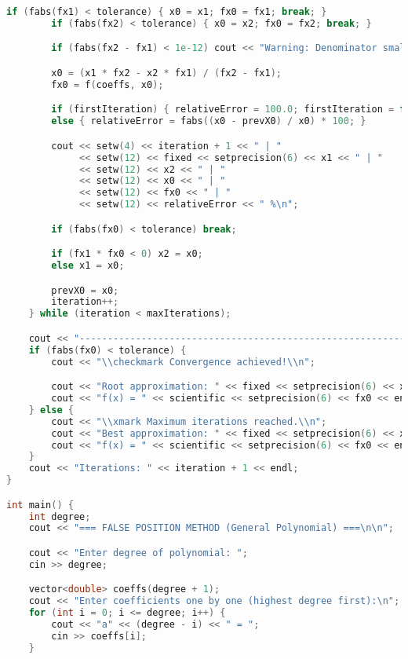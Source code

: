 \documentclass[12pt,a4paper]{article}
\begin{document}
\begin{lstlisting}[language=C++, caption={False Position Method for General Polynomials}, label={lst:falseposition}]
        if (fabs(fx1) < tolerance) { x0 = x1; fx0 = fx1; break; }
        if (fabs(fx2) < tolerance) { x0 = x2; fx0 = fx2; break; }

        if (fabs(fx2 - fx1) < 1e-12) cout << "Warning: Denominator small, may cause precision issues.\n";

        x0 = (x1 * fx2 - x2 * fx1) / (fx2 - fx1);
        fx0 = f(coeffs, x0);

        if (firstIteration) { relativeError = 100.0; firstIteration = false; }
        else { relativeError = fabs((x0 - prevX0) / x0) * 100; }

        cout << setw(4) << iteration + 1 << " | "
             << setw(12) << fixed << setprecision(6) << x1 << " | "
             << setw(12) << x2 << " | "
             << setw(12) << x0 << " | "
             << setw(12) << fx0 << " | "
             << setw(12) << relativeError << " %\n";

        if (fabs(fx0) < tolerance) break;

        if (fx1 * fx0 < 0) x2 = x0;
        else x1 = x0;

        prevX0 = x0;
        iteration++;
    } while (iteration < maxIterations);

    cout << "-------------------------------------------------------------------------------\n";
    if (fabs(fx0) < tolerance) {
        cout << "\\checkmark Convergence achieved!\\n";

        cout << "Root approximation: " << fixed << setprecision(6) << x0 << endl;
        cout << "f(x) = " << scientific << setprecision(6) << fx0 << endl;
    } else {
        cout << "\\xmark Maximum iterations reached.\\n";
        cout << "Best approximation: " << fixed << setprecision(6) << x0 << endl;
        cout << "f(x) = " << scientific << setprecision(6) << fx0 << endl;
    }
    cout << "Iterations: " << iteration + 1 << endl;
}

int main() {
    int degree;
    cout << "=== FALSE POSITION METHOD (General Polynomial) ===\n\n";

    cout << "Enter degree of polynomial: ";
    cin >> degree;

    vector<double> coeffs(degree + 1);
    cout << "Enter coefficients one by one (highest degree first):\n";
    for (int i = 0; i <= degree; i++) {
        cout << "a" << (degree - i) << " = ";
        cin >> coeffs[i];
    }


\end{lstlisting}
\end{document}
